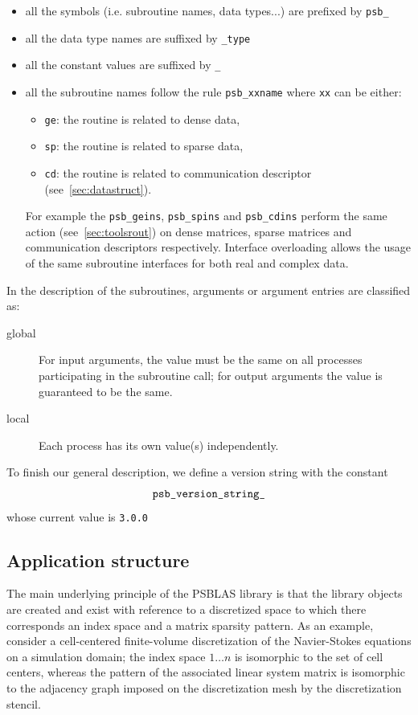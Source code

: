\begin{itemize}
\item all the symbols (i.e. subroutine names, data types...) are
  prefixed by \verb|psb_| 
\item all the data type names are suffixed by \verb|_type|
\item all the constant values are suffixed by \verb|_|
\item all the subroutine names follow the rule \verb|psb_xxname| where
  \verb|xx| can be either:
  \begin{itemize}
  \item \verb|ge|: the routine is related to dense data, 
  \item \verb|sp|: the routine is related to sparse data, 
  \item \verb|cd|: the routine is related to communication descriptor
        (see~\ref{sec:datastruct}).
  \end{itemize}
  For example the \verb|psb_geins|, \verb|psb_spins| and
  \verb|psb_cdins| perform the same action (see~\ref{sec:toolsrout}) on
  dense matrices, sparse matrices and communication descriptors
  respectively.
  Interface overloading allows the usage of the same subroutine
  interfaces for both real and complex data.
\end{itemize}
In the description of the subroutines, arguments or argument entries
are classified as:
\begin{description}
\item[global] For input arguments, the value must be the same on all processes
  participating in the subroutine call; for output arguments the value
  is guaranteed to be the same.
\item[local] Each process has its own value(s) independently.
\end{description}
To finish our general description, we define a version string with the
constant 
\[ \verb|psb_version_string_|\]
whose current value is \verb|3.0.0|

\subsection{Application structure}

The main underlying principle of the PSBLAS library is that the
library objects are created and exist with reference to a discretized
space to which there corresponds an index space and a matrix sparsity
pattern. As an example, consider a cell-centered finite-volume
discretization of  the Navier-Stokes equations on a simulation domain;
the index space $1\dots n$ is isomorphic to the set of cell centers,
whereas the pattern of the associated linear system matrix is
isomorphic to the adjacency graph imposed on the discretization mesh
by the discretization stencil. 

